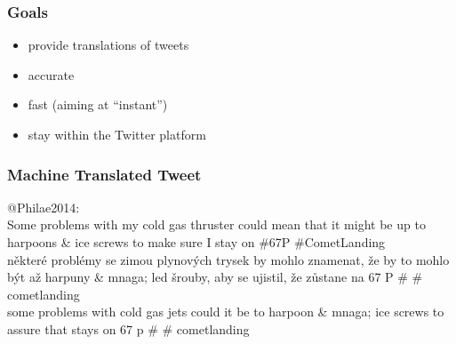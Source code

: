 \documentclass[12pt]{beamer}
\begin{document}
\begin{frame}
	\frametitle{Goals}
	\begin{itemize}
		\item \textcolor{TCTsilver}{provide translations of tweets}
		\item \textcolor{TCTsilver}{accurate}
		\item \textcolor{TCTsilver}{fast (aiming at ``instant'')}
		\item \textcolor{TCTsilver}{stay within the Twitter platform}
	\end{itemize}
\end{frame}

\begin{frame}
	\frametitle{Machine Translated Tweet}
	\begin{center}
	\textcolor{TCTgray}{\Large @Philae2014:}
	\\[0.5cm]
	\textcolor{TCTblue}{Some problems with my cold gas thruster could mean that it might be up to harpoons \& ice screws to make sure I stay on \#67P  \#CometLanding}
	\\[0.5cm]
	\textcolor{TCTgray}{některé problémy se zimou plynových trysek by mohlo znamenat, že by to mohlo být až harpuny \& mnaga; led šrouby, aby se ujistil, že zůstane na 67 P \# \# cometlanding }
	\\[0.5cm]
	\textcolor{TCTblue}{some problems with cold gas jets could it be to harpoon \& mnaga; ice screws to assure that stays on 67 p \# \# cometlanding }
	\end{center}
\end{frame}
\end{document}

